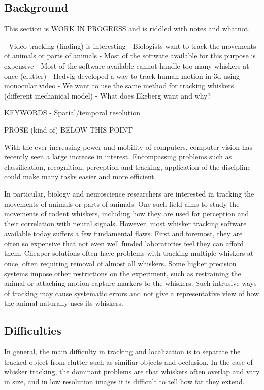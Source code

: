 \subsection{Background}
This section is WORK IN PROGRESS and is riddled with notes and whatnot.

- Video tracking (finding) is interesting
- Biologists want to track the movements of animals or parts of animals
- Most of the software available for this purpose is expensive
- Most of the software available cannot handle too many whiskers at once (clutter)
- Hedvig developed a way to track human motion in 3d using monocular video
- We want to use the same method for tracking whiskers (different mechanical model)
- What does Ekeberg want and why?

KEYWORDS
- Spatial/temporal resolution


PROSE (kind of) BELOW THIS POINT


With the ever increasing power and mobility of computers, computer vision has recently seen a large increase in interest. Encompassing problems such as classification, recognition, perception and tracking, application of the discipline could make many tasks easier and more efficient.

In particular, biology and neuroscience researchers are interested in tracking the movements of animals or parts of animals. One such field aims to study the movements of rodent whiskers, including how they are used for perception and their correlation with neural signals. However, most whisker tracking software available today suffers a few fundamental flaws. First and foremost, they are often so expensive that not even well funded laboratories feel they can afford them. Cheaper solutions often have problems with tracking multiple whiskers at once, often requiring removal of almost all whiskers. Some higher precision systems impose other restrictions on the experiment, such as restraining the animal or attaching motion capture markers to the whiskers. Such intrusive ways of tracking may cause systematic errors and not give a representative view of how the animal naturally uses its whiskers.

\subsection{Difficulties}
In general, the main difficulty in tracking and localization is to separate the tracked object from clutter such as similiar objects and occlusion. In the case of whisker tracking, the dominant problems are that whiskers often overlap and vary in size, and in low resolution images it is difficult to tell how far they extend.

